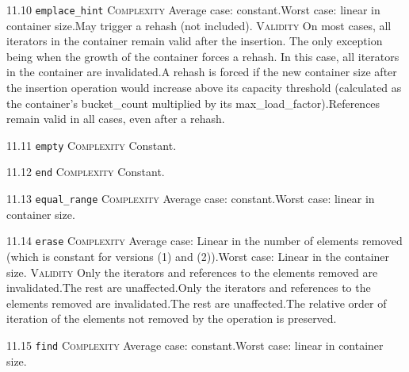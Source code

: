 \noindent\textcolor{corange}{11.10 \texttt{emplace\_hint}} \textsc{Complexity} Average case: constant.Worst case: linear in container size.May trigger a rehash (not included). \textsc{Validity} On most cases, all iterators in the container remain valid after the insertion. The only exception being when the growth of the container forces a rehash. In this case, all iterators in the container are invalidated.A rehash is forced if the new container size after the insertion operation would increase above its capacity threshold (calculated as the container's bucket\_count multiplied by its max\_load\_factor).References remain valid in all cases, even after a rehash.\vspace{0.5em}

\noindent\textcolor{cgreen}{11.11 \texttt{empty}} \textsc{Complexity} Constant. \vspace{0.5em}

\noindent\textcolor{cgreen}{11.12 \texttt{end}} \textsc{Complexity} Constant. \vspace{0.5em}

\noindent\textcolor{corange}{11.13 \texttt{equal\_range}} \textsc{Complexity} Average case: constant.Worst case: linear in container size. \vspace{0.5em}

\noindent\textcolor{corange}{11.14 \texttt{erase}} \textsc{Complexity} Average case: Linear in the number of elements removed (which is constant for versions (1) and (2)).Worst case: Linear in the container size. \textsc{Validity} Only the iterators and references to the elements removed are invalidated.The rest are unaffected.Only the iterators and references to the elements removed are invalidated.The rest are unaffected.The relative order of iteration of the elements not removed by the operation is preserved.\vspace{0.5em}

\noindent\textcolor{corange}{11.15 \texttt{find}} \textsc{Complexity} Average case: constant.Worst case: linear in container size. \vspace{0.5em}

